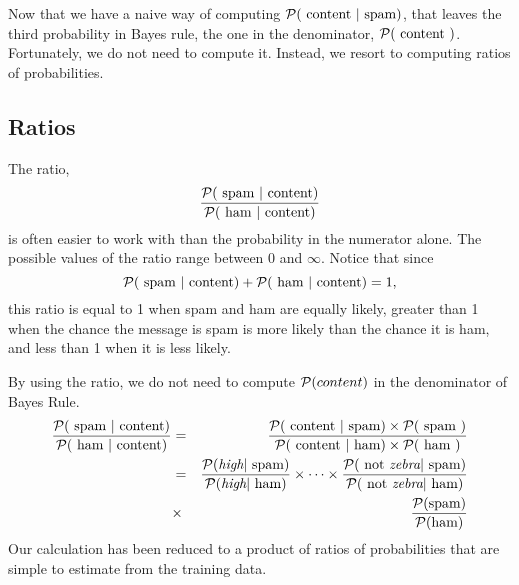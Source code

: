 \documentclass{article}
\begin{document}
Now that we have a naive way of computing 
${\cal P}(\textrm{ content }|\textrm{ spam} )$,
that leaves the third probability in Bayes rule,
the one in the denominator,
${\cal P}(\textrm{ content })$.
Fortunately, we do not need to compute it.
Instead, we resort to computing ratios of probabilities.

\subsection*{Ratios}
The ratio,
$$\frac {{\cal P}(\textrm{ spam } | \textrm{ content} )}
 {{\cal P}(\textrm{ ham } | \textrm{ content} )}$$
is often easier to work with than the probability in the
numerator alone. 
The possible values of the ratio range between 0 and $\infty$.
Notice that since  
$${{\cal P}(\textrm{ spam } | \textrm{ content} )}
 +{{\cal P}(\textrm{ ham } | \textrm{ content} )} = 1,$$
this ratio is equal to 1 when spam and ham are equally likely,
greater than 1 when the chance the message is spam is more likely than 
the chance it is ham, and less than 1 when it is less likely.

By using the ratio, we do not need to compute ${\cal P}(content)$ 
in the denominator of Bayes Rule.
\begin{eqnarray*}
 \frac {{\cal P}(\textrm{ spam } | \textrm{ content} )}
 {{\cal P}(\textrm{ ham } | \textrm{ content} )} 
 &=&
  \frac {{\cal P}(\textrm{ content }|\textrm{ spam} )\times {\cal P}(\textrm{ spam })}
  {{\cal P}(\textrm{ content }|\textrm{ ham} )\times {\cal P}(\textrm{ ham })}\\
 &=&
  \frac {{\cal P}(\textit{high}|\textrm{ spam} )} {{\cal P}(\textit{high}|\textrm{ ham} )} 
  \times
  \cdots \times
  \frac {{\cal P}(\textrm{ not }\textit{zebra}|\textrm{ spam} )} {{\cal P}(\textrm{ not }\textit{zebra}|\textrm{ ham} )} \\
 & \times &
  \frac {{\cal P}(\textrm{spam})} {{\cal P}(\textrm{ham})} 
\end{eqnarray*}
Our calculation has been reduced to a product of ratios of probabilities
that are simple to estimate from the training data.
\end{document}
